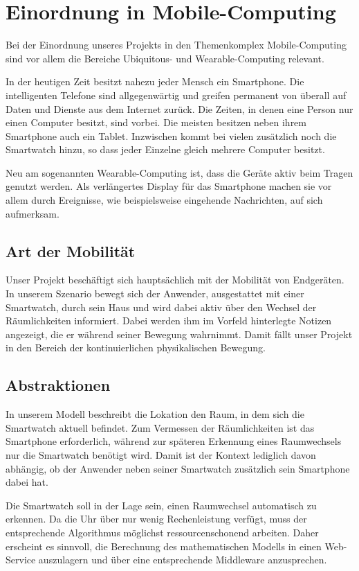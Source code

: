 \section{Einordnung in Mobile-Computing}
Bei der Einordnung unseres Projekts in den Themenkomplex Mobile-Computing sind vor allem die Bereiche Ubiquitous- und Wearable-Computing relevant. 

In der heutigen Zeit besitzt nahezu jeder Mensch ein Smartphone. Die intelligenten Telefone sind allgegenwärtig und greifen permanent von überall auf Daten und Dienste aus dem Internet zurück. Die Zeiten, in denen eine Person nur einen Computer besitzt, sind vorbei. Die meisten besitzen neben ihrem Smartphone auch ein Tablet. Inzwischen kommt bei vielen zusätzlich noch die Smartwatch hinzu, so dass jeder Einzelne gleich mehrere Computer besitzt.

Neu am sogenannten Wearable-Computing ist, dass die Geräte aktiv beim Tragen genutzt werden. Als verlängertes Display für das Smartphone machen sie vor allem durch Ereignisse, wie beispielsweise eingehende Nachrichten, auf sich aufmerksam. 

\subsection{Art der Mobilität}
Unser Projekt beschäftigt sich hauptsächlich mit der Mobilität von Endgeräten. In unserem Szenario bewegt sich der Anwender, ausgestattet mit einer Smartwatch, durch sein Haus und wird dabei aktiv über den Wechsel der Räumlichkeiten informiert. Dabei werden ihm im Vorfeld hinterlegte Notizen angezeigt, die er während seiner Bewegung wahrnimmt. Damit fällt unser Projekt in den Bereich der kontinuierlichen physikalischen Bewegung.

\subsection{Abstraktionen}
In unserem Modell beschreibt die Lokation den Raum, in dem sich die Smartwatch aktuell befindet. Zum Vermessen der Räumlichkeiten ist das Smartphone erforderlich, während zur späteren Erkennung eines Raumwechsels nur die Smartwatch benötigt wird. Damit ist der Kontext lediglich davon abhängig, ob der Anwender neben seiner Smartwatch zusätzlich sein Smartphone dabei hat.

Die Smartwatch soll in der Lage sein, einen Raumwechsel automatisch zu erkennen. Da die Uhr über nur wenig Rechenleistung verfügt, muss der entsprechende Algorithmus möglichst ressourcenschonend arbeiten. Daher erscheint es sinnvoll, die Berechnung des mathematischen Modells in einen Web-Service auszulagern und über eine entsprechende Middleware anzusprechen.

